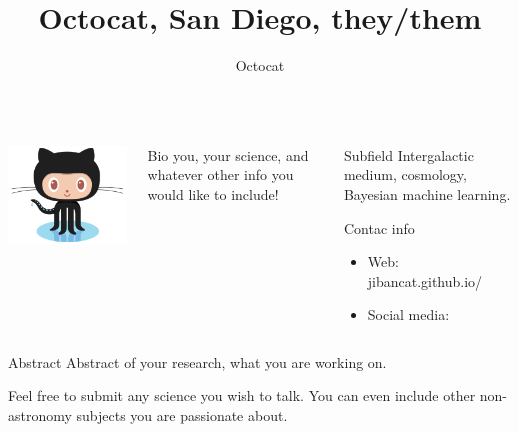 \documentclass{beamer}
\author[Octocat@ucsd.edu]{Octocat}
\title{Octocat, San Diego, they/them}
\institute{UC San Diego}
\begin{document}
\begin{frame}[fragile]
  \begin{columns}[T]

    \begin{column}{.33\textwidth}

      \begin{block}{}
        \begin{center}
          \includegraphics[width=8cm]{images/Octocat.png}
        \end{center}
      \end{block}
    \end{column}

    \begin{column}{.40\textwidth}

      \begin{block}{Bio}
        you, your science, and whatever other info you would like to include!
      \end{block}
    \end{column}

    \begin{column}{.20\textwidth}
      \begin{block}{Subfield}
        Intergalactic medium, cosmology, Bayesian machine learning.
      \end{block}
      \begin{block}{Contac info}
        \begin{itemize}
          \item Web: jibancat.github.io/
          \item Social media:
        \end{itemize}
      \end{block}

    \end{column}

  \end{columns}

  \begin{block}{Abstract}
    Abstract of your research, what you are working on.

    Feel free to submit any science you wish to talk. You can even include other non-astronomy subjects you are passionate about.
  \end{block}


\end{frame}
\end{document}
